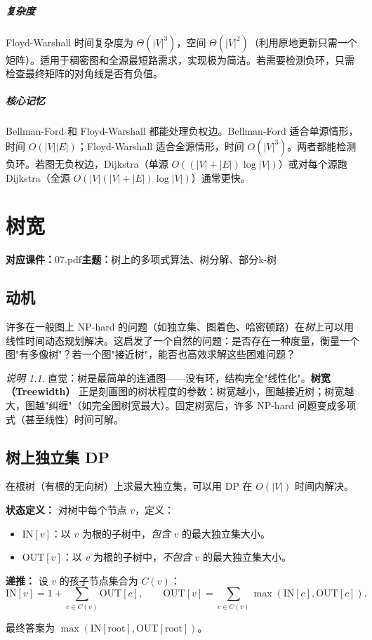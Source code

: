 \documentclass[UTF8,openany,12pt]{ctexbook}
\theoremstyle{remark}
\newtheorem{remark}{说明}[chapter]
\newcommand{\lecture}[3]{
  \chapter{#2}
  \noindent\textbf{对应课件：}#1\hfill\textbf{主题：}#3
  \vspace{0.6em}
}
\newcommand{\keypoint}[1]{\paragraph{核心记忆}#1}
\newcommand{\complexity}[1]{\paragraph{复杂度}#1}
\newcommand{\NP}{\mathrm{NP}}
\begin{document}
\complexity{Floyd-Warshall 时间复杂度为 $\Theta(|V|^3)$，空间 $\Theta(|V|^2)$（利用原地更新只需一个矩阵）。适用于稠密图和全源最短路需求，实现极为简洁。若需要检测负环，只需检查最终矩阵的对角线是否有负值。}

\keypoint{Bellman-Ford 和 Floyd-Warshall 都能处理负权边。Bellman-Ford 适合单源情形，时间 $O(|V||E|)$；Floyd-Warshall 适合全源情形，时间 $O(|V|^3)$。两者都能检测负环。若图无负权边，Dijkstra（单源 $O((|V|+|E|)\log|V|)$）或对每个源跑 Dijkstra（全源 $O(|V|(|V|+|E|)\log|V|)$）通常更快。}

\lecture{07.pdf}{树宽}{树上的多项式算法、树分解、部分k-树}

\section{动机}

许多在一般图上 $\NP$-hard 的问题（如独立集、图着色、哈密顿路）在\emph{树}上可以用线性时间动态规划解决。这启发了一个自然的问题：是否存在一种度量，衡量一个图"有多像树"？若一个图"接近树"，能否也高效求解这些困难问题？

\begin{remark}
直觉：树是最简单的连通图——没有环，结构完全"线性化"。\textbf{树宽（Treewidth）} 正是刻画图的树状程度的参数：树宽越小，图越接近树；树宽越大，图越"纠缠"（如完全图树宽最大）。固定树宽后，许多 $\NP$-hard 问题变成多项式（甚至线性）时间可解。
\end{remark}

\section{树上独立集 DP}

在根树（有根的无向树）上求最大独立集，可以用 DP 在 $O(|V|)$ 时间内解决。

\textbf{状态定义：} 对树中每个节点 $v$，定义：
\begin{itemize}
  \item $\mathrm{IN}[v]$：以 $v$ 为根的子树中，\emph{包含} $v$ 的最大独立集大小。
  \item $\mathrm{OUT}[v]$：以 $v$ 为根的子树中，\emph{不包含} $v$ 的最大独立集大小。
\end{itemize}

\textbf{递推：} 设 $v$ 的孩子节点集合为 $C(v)$：
\[
  \mathrm{IN}[v] = 1 + \sum_{c \in C(v)} \mathrm{OUT}[c], \qquad
  \mathrm{OUT}[v] = \sum_{c \in C(v)} \max(\mathrm{IN}[c], \mathrm{OUT}[c]).
\]

最终答案为 $\max(\mathrm{IN}[\text{root}], \mathrm{OUT}[\text{root}])$。
\end{document}
